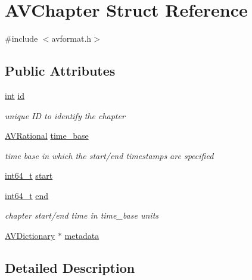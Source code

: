 \hypertarget{struct_a_v_chapter}{}\section{A\+V\+Chapter Struct Reference}
\label{struct_a_v_chapter}


{\ttfamily \#include $<$avformat.\+h$>$}

\subsection*{Public Attributes}
\begin{DoxyCompactItemize}
\item 
\hyperlink{xmltok_8h_a5a0d4a5641ce434f1d23533f2b2e6653}{int} \hyperlink{struct_a_v_chapter_a2a48026c205e948f8bfaafe92d41f752}{id}
\begin{DoxyCompactList}\small\item\em unique ID to identify the chapter \end{DoxyCompactList}\item 
\hyperlink{struct_a_v_rational}{A\+V\+Rational} \hyperlink{struct_a_v_chapter_acb5cb6ce9bb6b9f4b970a919f4899818}{time\+\_\+base}
\begin{DoxyCompactList}\small\item\em time base in which the start/end timestamps are specified \end{DoxyCompactList}\item 
\hyperlink{lib-src_2ffmpeg_2win32_2stdint_8h_a67a9885ef4908cb72ce26d75b694386c}{int64\+\_\+t} \hyperlink{struct_a_v_chapter_a499a5062224e22249be6f2d16f74c449}{start}
\item 
\hyperlink{lib-src_2ffmpeg_2win32_2stdint_8h_a67a9885ef4908cb72ce26d75b694386c}{int64\+\_\+t} \hyperlink{struct_a_v_chapter_ab68f32dc07fac89b4364e86483b00f3e}{end}
\begin{DoxyCompactList}\small\item\em chapter start/end time in time\+\_\+base units \end{DoxyCompactList}\item 
\hyperlink{group__lavu__dict_ga1d7cc0833bee918994a600556410315f}{A\+V\+Dictionary} $\ast$ \hyperlink{struct_a_v_chapter_a998ea9c9f86547970d58f0b405d55332}{metadata}
\end{DoxyCompactItemize}


\subsection{Detailed Description}


